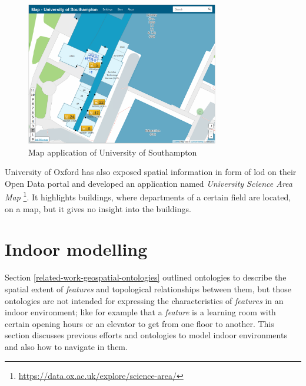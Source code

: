 \documentclass[draft,final]{vutinfth} %
\begin{document}
\begin{figure}[h]
    \centering
    \includegraphics[width=0.75\textwidth]{graphics/maps/southampton-map-app.png}
    \caption{Map application of University of Southampton}
    \label{fig:related-work-map-app:southampton}
\end{figure}

University of Oxford has also exposed spatial information in form of \gls{lod} on their Open Data portal and developed an application named \textit{University Science Area Map} \footnote{\url{https://data.ox.ac.uk/explore/science-area/}}. It highlights buildings, where departments of a certain field are located, on a map, but it gives no insight into the buildings.

\section{Indoor modelling}
\label{related-work-indoor-modelling}
Section \ref{related-work-geospatial-ontologies} outlined ontologies to describe the spatial extent of \textit{features} and topological relationships between them, but those ontologies are not intended for expressing the characteristics of \textit{features} in an indoor environment; like for example that a \textit{feature} is a learning room with certain opening hours or an elevator to get from one floor to another. This section discusses previous efforts and ontologies to model indoor environments and also how to navigate in them.
\end{document}
